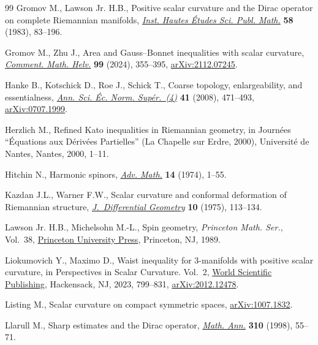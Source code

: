 \documentclass[pdftex]{sigma}
\numberwithin{equation}{section}
\begin{document}
\begin{thebibliography}{99}
Gromov M., Lawson Jr. H.B., Positive scalar curvature and the {D}irac operator
  on complete {R}iemannian manifolds, \href{https://doi.org/10.1007/BF02953774}{\textit{Inst. Hautes \'Etudes Sci. Publ.
  Math.}} \textbf{58} (1983), 83--196.

Gromov M., Zhu J., Area and {G}auss--{B}onnet inequalities with scalar
  curvature, \href{https://doi.org/10.4171/cmh/570}{\textit{Comment. Math. Helv.}} \textbf{99} (2024), 355--395,
  \href{https://arxiv.org/abs/2112.07245}{arXiv:2112.07245}.

Hanke B., Kotschick D., Roe J., Schick T., Coarse topology, enlargeability, and
  essentialness, \href{https://doi.org/10.24033/asens.2073}{\textit{Ann. Sci. \'Ec. Norm. Sup\'er.~(4)}} \textbf{41}
  (2008), 471--493, \href{https://arxiv.org/abs/0707.1999}{arXiv:0707.1999}.

Herzlich M., Refined {K}ato inequalities in {R}iemannian geometry, in
  Journ\'ees ``\'Equations aux {D}\'eriv\'ees {P}artielles'' ({L}a {C}hapelle
  sur {E}rdre, 2000), Universit\'e de Nantes, Nantes, 2000, 1--11.

Hitchin N., Harmonic spinors, \href{https://doi.org/10.1016/0001-8708(74)90021-8}{\textit{Adv. Math.}} \textbf{14} (1974), 1--55.

Kazdan J.L., Warner F.W., Scalar curvature and conformal deformation of
  {R}iemannian structure, \href{https://doi.org/10.4310/jdg/1214432678}{\textit{J.~Differential Geometry}} \textbf{10} (1975),
  113--134.

Lawson Jr. H.B., Michelsohn M.-L., Spin geometry, \textit{Princeton Math. Ser.},
  Vol.~38, \href{https://doi.org/10.1515/9781400883912}{Princeton University Press}, Princeton, NJ, 1989.

Liokumovich Y., Maximo D., Waist inequality for 3-manifolds with positive
  scalar curvature, in Perspectives in {S}calar {C}urvature. {V}ol.~2, \href{https://doi.org/10.1142/9789811273230_0022}{World
  Scientific Publishing}, Hackensack, NJ, 2023, 799--831, \href{https://arxiv.org/abs/2012.12478}{arXiv:2012.12478}.

Listing M., Scalar curvature on compact symmetric spaces, \href{https://arxiv.org/abs/1007.1832}{arXiv:1007.1832}.

Llarull M., Sharp estimates and the {D}irac operator, \href{https://doi.org/10.1007/s002080050136}{\textit{Math. Ann.}}
  \textbf{310} (1998), 55--71.


\end{thebibliography}
\end{document}
